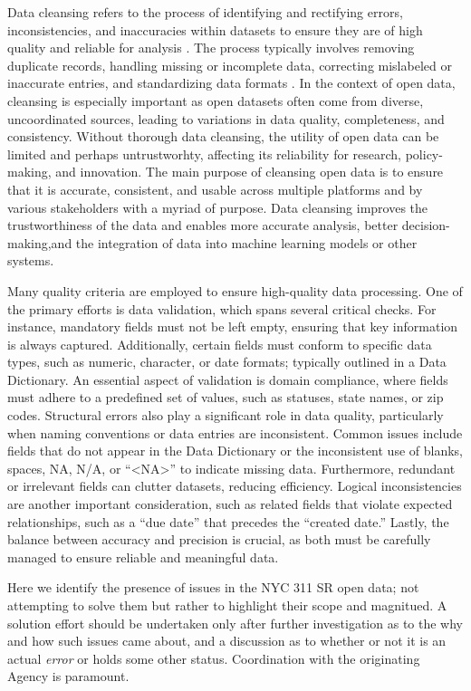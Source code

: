 \documentclass[linenumber]{jdsart}
\begin{document}
Data cleansing refers to the process of identifying and rectifying
errors, inconsistencies, and inaccuracies within datasets to ensure
they are of high quality and reliable for analysis
\citep{maletic2005data, hosseinzadeh2023data}. The process
typically involves removing duplicate records, handling missing or
incomplete data, correcting mislabeled or inaccurate entries, and
standardizing data formats \citep[e.g.,][]{cody2017cody,
  van2018statistical}. In the context of open data, cleansing is
especially important as open datasets often come from diverse,
uncoordinated sources, leading to variations in data quality,
completeness, and consistency. Without thorough data cleansing, the utility
of open data can be limited and perhaps untrustworhty, affecting 
its reliability for research, policy-making, and innovation. The 
main purpose of cleansing open data is to ensure that it is 
accurate, consistent, and usable across multiple platforms and by 
various stakeholders with a myriad of purpose. Data cleansing improves
the trustworthiness of the data and enables more accurate analysis, 
better decision-making,and the integration of data into machine
learning models or other systems.


Many quality criteria are employed to ensure high-quality data 
processing. One of the primary efforts is data validation, which spans 
several critical checks. For instance, mandatory fields must not be 
left empty, ensuring that key information is always captured. 
Additionally, certain fields must conform to specific data types, 
such as numeric, character, or date formats; typically 
outlined in a Data Dictionary. An essential aspect of validation 
is domain compliance, where fields must adhere to a predefined set of 
values, such as statuses, state names, or zip codes. Structural 
errors also play a significant role in data quality, particularly when 
naming conventions or data entries are inconsistent. Common issues 
include fields that do not appear in the Data Dictionary or the 
inconsistent use of blanks, spaces, NA, N/A, or ``<NA>'' to indicate 
missing data. Furthermore, redundant or irrelevant fields can clutter 
datasets, reducing efficiency. Logical inconsistencies are another 
important consideration, such as related fields that violate expected 
relationships, such as a ``due date'' that precedes the ``created date.'' 
Lastly, the balance between accuracy and precision is crucial, as both 
must be carefully managed to ensure reliable and meaningful data.


Here we identify the presence of issues in the NYC 311 SR open data;
not attempting to solve them but rather to highlight their scope and
magnitued. A solution effort should be undertaken only after further 
investigation as to the why and how such issues came about, 
and a discussion as to whether or not it is an actual \textit{error} or 
holds some other status. Coordination with the originating Agency
is paramount.
\end{document}
